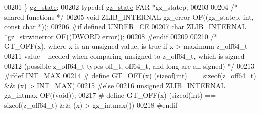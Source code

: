 \begin{DoxyCode}
00201 \} \hyperlink{structgz__state}{gz\_state};
00202 \textcolor{keyword}{typedef} \hyperlink{structgz__state}{gz\_state} FAR *gz\_statep;
00203 
00204 \textcolor{comment}{/* shared functions */}
00205 \textcolor{keywordtype}{void} ZLIB\_INTERNAL gz\_error OF((gz\_statep, \textcolor{keywordtype}{int}, \textcolor{keyword}{const} \textcolor{keywordtype}{char} *));
00206 \textcolor{preprocessor}{#if defined UNDER\_CE}
00207 \textcolor{keywordtype}{char} ZLIB\_INTERNAL *gz\_strwinerror OF((DWORD error));
00208 \textcolor{preprocessor}{#endif}
00209 
00210 \textcolor{comment}{/* GT\_OFF(x), where x is an unsigned value, is true if x > maximum z\_off64\_t}
00211 \textcolor{comment}{   value -- needed when comparing unsigned to z\_off64\_t, which is signed}
00212 \textcolor{comment}{   (possible z\_off64\_t types off\_t, off64\_t, and long are all signed) */}
00213 \textcolor{preprocessor}{#ifdef INT\_MAX}
00214 \textcolor{preprocessor}{#  define GT\_OFF(x) (sizeof(int) == sizeof(z\_off64\_t) && (x) > INT\_MAX)}
00215 \textcolor{preprocessor}{#else}
00216 \textcolor{keywordtype}{unsigned} ZLIB\_INTERNAL gz\_intmax OF((\textcolor{keywordtype}{void}));
00217 \textcolor{preprocessor}{#  define GT\_OFF(x) (sizeof(int) == sizeof(z\_off64\_t) && (x) > gz\_intmax())}
00218 \textcolor{preprocessor}{#endif}
\end{DoxyCode}
